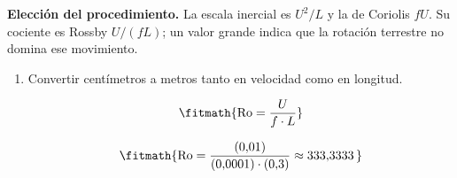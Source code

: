 \noindent\textbf{Elección del procedimiento.} La escala inercial es $U^2/L$ y la de Coriolis $fU$. Su cociente es Rossby $U/(fL)$; un valor grande indica que la rotación terrestre no domina ese movimiento.

\begin{enumerate}

\item Convertir centímetros a metros tanto en velocidad como en longitud.

\[\fitmath{\mathrm{Ro}=\frac{U}{f\cdot L}}\]

\[\fitmath{\mathrm{Ro}=\frac{(0{,}01)}{(0{,}0001)\cdot (0{,}3)}\approx 333{,}3333\,}\]

\end{enumerate}
